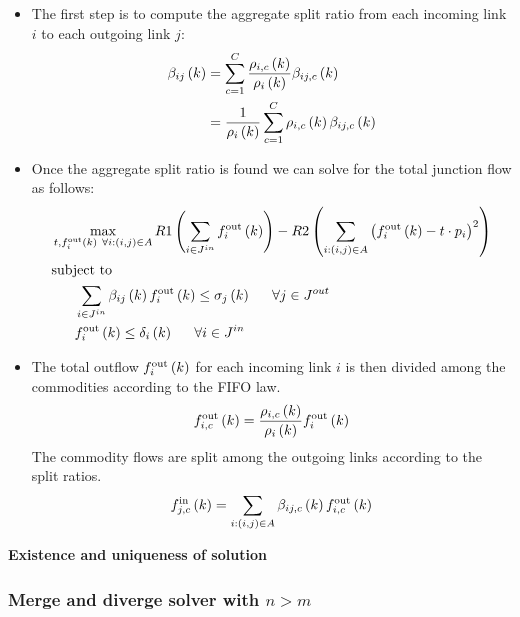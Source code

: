 \begin{itemize}
\item The first step is to compute the aggregate split ratio from each incoming link $i$ to each outgoing link $j$:
	\begin{align*}
	\aggsplitratio{i}{j}{k} &= \sum_{c=1}^C \frac{\densitymc{i}{k}{c}}{\density{i}{k}}\splitratio{i}{j}{k}{c}\\
							&=  \frac{1}{\density{i}{k}} \sum_{c=1}^C \densitymc{i}{k}{c}\splitratio{i}{j}{k}{c}
	\end{align*} 

\item Once the aggregate split ratio is found we can solve for the total junction flow as follows:
	\begin{align*}
	&\max_{t,\flowout{i}{k} \ \forall{i:(i,j)\in A}}{R1 \left(\sum_{i \in J^{in}}\flowout{i}{k}\right) - R2\left(\sum_{i:(i,j)\in A}\left(\flowout{i}{k} - t\cdot p_i\right)^2\right)} \\
	&\text{subject to} \\
	&\ \ \ \ \ \sum_{i \in J^{in}}\aggsplitratio{i}{j}{k} \flowout{i}{k} \le{\cellsupply{j}{k}} \ \ \ \ \ \forall{j\in J^{out}}\\
	&\ \ \ \ \ \flowout{i}{k} \le{\celldemand{i}{k}} \ \ \ \ \ \forall{i\in J^{in}}
	\end{align*}

\item The total outflow $\flowout{i}{k}$ for each incoming link $i$ is then divided among the commodities according to the FIFO law.
	\begin{align*}
	\flowoutmc{i}{k}{c} &= \frac{\densitymc{i}{k}{c}}{\density{i}{k}}\flowout{i}{k}\\
	\end{align*} 
	The commodity flows are split among the outgoing links according to the split ratios.
	\begin{align*}
	\flowinmc{j}{k}{c} &= \sum_{i:(i,j)\in A} \splitratio{i}{j}{k}{c} \flowoutmc{i}{k}{c}\\
	\end{align*} 


\end{itemize}



\textbf{Existence and uniqueness of solution}

\subsubsection{Merge and diverge solver with $n > m$} 

